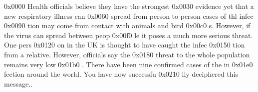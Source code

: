 0x0000 Health officials believe they have the strongest
0x0030  evidence yet that a new respiratory illness can
0x0060  spread from person to person cases of thl infec
0x0090 tion may come from contact with animals and bird
0x00c0 s. However, if the virus can spread between peop
0x00f0 le it poses a much more serious threat. One pers
0x0120 on in the UK is thought to have caught the infec
0x0150 tion from a relative. However, officials say the
0x0180  threat to the whole population remains very low
0x01b0 . There have been nine confirmed cases of the in
0x01e0 fection around the world. You have now successfu
0x0210 lly deciphered this message..
